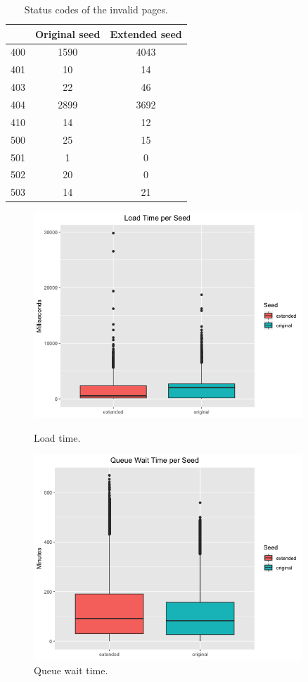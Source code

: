 \documentclass{article}
\begin{document}
\begin{table}[hbt!]
	\centering
	\begin{tabular}{r|c|c}
		& Original seed & Extended seed \\ \hline
		400 & 1590 & 4043 \\ \hline
		401 & 10 & 14  \\ \hline
		403 & 22 & 46 \\ \hline
		404 & 2899 & 3692 \\ \hline
		410 & 14 & 12 \\ \hline
		500 & 25 & 15 \\ \hline
		501 & 1 & 0 \\ \hline
		502 & 20 & 0 \\ \hline
		503 & 14 & 21 \\
	\end{tabular}
	\caption{Status codes of the invalid pages. }
	\label{tab:2}
\end{table}


\begin{figure}
	\begin{minipage}{0.45\textwidth}
		\centering
		\includegraphics[width=0.9\textwidth]{load_time.png}
		\caption{Load time.}
		\label{fig:3}
	\end{minipage}\hfill
	\begin{minipage}{0.45\textwidth}
		\centering
		\includegraphics[width=0.9\textwidth]{queue_wait_time.png}
		\caption{Queue wait time.}
		\label{fig:4}
	\end{minipage}
\end{figure}
\end{document}
